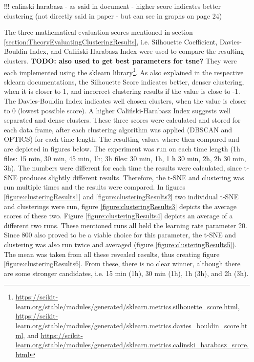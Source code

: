 !!! calinski harabasz - as said in document - higher score indicates better clustering (not directly said in paper - but can see in graphs on page 24)

The three mathematical evaluation scores mentioned in section \ref{section:TheoryEvaluatingClusteringResults}, i.e. Silhouette Coefficient, Davies-Bouldin Index, and Caliński-Harabasz Index were used to compare the resulting clusters. \textbf{TODO: also used to get best parameters for tsne?} They were each implemented using the sklearn library\footnote{\url{https://scikit-learn.org/stable/modules/generated/sklearn.metrics.silhouette_score.html}, \url{https://scikit-learn.org/stable/modules/generated/sklearn.metrics.davies_bouldin_score.html}, and \url{https://scikit-learn.org/stable/modules/generated/sklearn.metrics.calinski_harabasz_score.html}}.
As also explained in the respective sklearn documentations, the Silhouette Score indicates better, denser clustering, when it is closer to 1, and incorrect clustering results if the value is close to -1. The Davies-Bouldin Index indicates well chosen clusters, when the value is closer to 0 (lowest possible score). A higher Caliński-Harabasz Index suggests well separated and dense clusters.
These three scores were calculated and stored for each data frame, after each clustering algorithm was applied (DBSCAN and OPTICS) for each time length. The resulting values where then compared and are depicted in figures below. 
The experiment was run on each time length (1h files: 15 min, 30 min, 45 min, 1h; 3h files: 30 min, 1h, 1 h 30 min, 2h, 2h 30 min, 3h).
The numbers were different for each time the results were calculated, since t-SNE produces slightly different results. Therefore, the t-SNE and clustering was run multiple times and the results were compared. In figures \ref{figure:clusteringResults1} and \ref{figure:clusteringResults2} two individual t-SNE and clusterings were run, figure \ref{figure:clusteringResults3} depicts the average scores of these two. Figure \ref{figure:clusteringResults4} depicts an average of a different two runs. These mentioned runs all held the learning rate parameter 20. Since 800 also proved to be a viable choice for this parameter, the t-SNE and clustering was also run twice and averaged (figure \ref{figure:clusteringResults5}). The mean was taken from all these revealed results, thus creating figure \ref{figure:clusteringResults6}. From these, there is no clear winner, although there are some stronger candidates, i.e. 15 min (1h), 30 min (1h), 1h (3h), and 2h (3h). 

